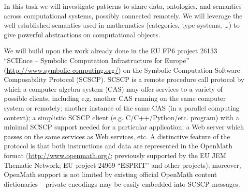 \begin{workpackage}[id=component-architecture,wphases=0-48!.5,
  title=Component Architecture,lead=UV,
  PSRM=64,UVRM=8,SARM=16, USHRM=4, USORM=6, UBRM=12]
\begin{tasklist}
\begin{task}[id=portability,title=Portability,lead=UV,PM=28]
  \end{task}

  \begin{task}[title=Interfaces between systems,id=interface-systems,lead=PS,PM=18]
    In this task we will investigate patterns to share data,
    ontologies, and semantics across computational systems, possibly
    connected remotely.  We will leverage the well established
    semantics used in mathematics (categories, type systems, \dots) to
    give powerful abstractions on computational objects.
    
    We will build upon the work already done in the EU FP6 project
    26133 ``SCIEnce -- Symbolic Computation Infrastructure for
    Europe'' (\url{http://www.symbolic-computing.org/}) on the Symbolic Computation
    Software Composability Protocol (SCSCP). SCSCP is a remote
    procedure call protocol by which a computer algebra system (CAS)
    may offer services to a variety of possible clients, including
    e.g.  another CAS running on the same computer system or remotely;
    another instance of the same CAS (in a parallel computing
    context); a simplistic SCSCP client
    (e.g. C/C++/Python/etc. program) with a minimal SCSCP support
    needed for a particular application; a Web server which passes on
    the same services as Web services, etc.  A distinctive feature of
    the protocol is that both instructions and data are represented in
    the OpenMath format (\url{http://www.openmath.org/}; previously
    supported by the EU JEM Thematic Network; EU project 24969
    ``ESPRIT'' and other projects); moreover, OpenMath support is not
    limited by existing official OpenMath content dictionaries --
    private encodings may be easily embedded into SCSCP messages.
    

\end{task}
\end{tasklist}
\end{workpackage}
